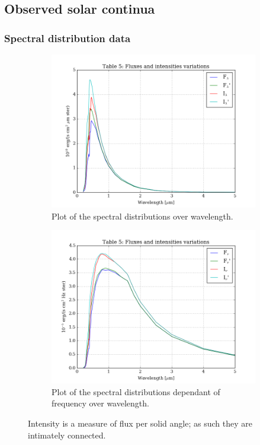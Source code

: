 \documentclass[11pt,a4paper,notitlepage]{article}
\begin{document}
\subsection{Observed solar continua}

\subsubsection{Spectral distribution data}
\begin{figure}[H]
\center

	\begin{subfigure}{0.49\textwidth}
	\includegraphics[scale=0.42]{../figs/2obs_sol_cont.png}
	\caption{Plot of the spectral distributions over wavelength.}
	\end{subfigure}
	\hfill
	\begin{subfigure}{0.49\textwidth}
	\includegraphics[scale=0.42]{../figs/2obs_sol_cont_freq.png}
	\caption{Plot of the spectral distributions dependant of frequency over wavelength.}
	\end{subfigure}

\caption{Intensity is a measure of flux per solid angle; as such they are intimately connected.}
\end{figure}
\end{document}
